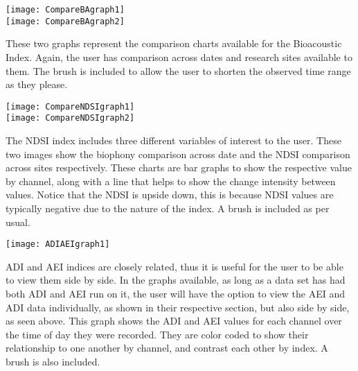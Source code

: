 \begin{center}
	\texttt{[image: CompareBAgraph1]} \\[12pt]
	\texttt{[image: CompareBAgraph2]} \\[12pt]
\end{center}

These two graphs represent the comparison charts available for the Bioacoustic Index. Again, the user has comparison across dates and research sites available to them. The brush is included to allow the user to shorten the observed time range as they please.\\

\begin{center}
	\texttt{[image: CompareNDSIgraph1]} \\[12pt]
	\texttt{[image: CompareNDSIgraph2]} \\[12pt]
\end{center}

The NDSI index includes three different variables of interest to the user. These two images show the biophony comparison across date and the NDSI comparison across sites respectively. These charts are bar graphs to show the respective value by channel, along with a line that helps to show the change intensity between values. Notice that the NDSI is upside down, this is because NDSI values are typically negative due to the nature of the index. A brush is included as per usual.\\

\begin{center}
	\texttt{[image: ADIAEIgraph1]} \\[12pt]
\end{center}
ADI and AEI indices are closely related, thus it is useful for the user to be able to view them side by side. In the graphs available, as long as a data set has had both ADI and AEI run on it, the user will have the option to view the AEI and ADI data individually, as shown in their respective section, but also side by side, as seen above. This graph shows the ADI and AEI values for each channel over the time of day they were recorded. They are color coded to show their relationship to one another by channel, and contrast each other by index. A brush is also included.
